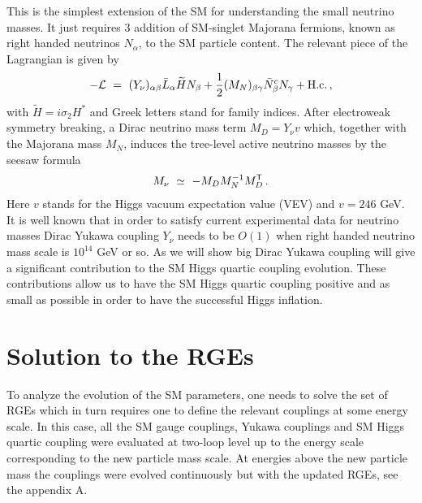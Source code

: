 \documentclass[aps,prd,preprint,superscriptaddress,showpacs,ctexart]{revtex4-1}
\begin{document}
This is the simplest extension of the SM for understanding the small
neutrino masses. It just requires 3 addition of SM-singlet Majorana
fermions, known as right handed neutrinos $N_{\alpha}$, to the SM
particle content. The relevant piece of the Lagrangian is given by
\begin{eqnarray*}
-{\cal L}\ =\ (Y_{\nu})_{\alpha\beta}\bar{L}_{\alpha}\widetilde{H}N_{\beta}+\frac{1}{2}(M_{N})_{\beta\gamma}\bar{N}_{\beta}^{c}N_{\gamma}+{\rm H.c.}\,,
\end{eqnarray*}
with $\widetilde{H}=i\sigma_{2}H^{*}$ and Greek letters stand for
family indices. After electroweak symmetry breaking, a Dirac neutrino
mass term $M_{D}=Y_{\nu}v$ which, together with the Majorana mass
$M_{N}$, induces the tree-level active neutrino masses by the seesaw
formula
\begin{align}
M_{\nu}\ \simeq\ -M_{D}M_{N}^{-1}M_{D}^{\sf T}\,.\label{seesaw}
\end{align}
Here $v$ stands for the Higgs vacuum expectation value (VEV) and
$v=246$ GeV. It is well known that in order to satisfy current experimental
data for neutrino masses Dirac Yukawa coupling $Y_{\nu}$ needs to
be $O(1)$ when right handed neutrino mass scale is $10^{14}$ GeV
or so. As we will show big Dirac Yukawa coupling will give a significant
contribution to the SM Higgs quartic coupling evolution. These
contributions allow us to have the SM Higgs quartic coupling positive and as small as possible
in order to have the successful Higgs inflation.


\section{Solution to the RGEs}

To analyze the evolution of the SM parameters, one needs to solve
the set of RGEs which in turn requires one to define the relevant
couplings at some energy scale. In this case, all the SM gauge couplings,
Yukawa couplings and SM Higgs quartic coupling were evaluated at
two-loop level up to the energy scale corresponding to the new particle
mass scale. At energies above the new particle mass the couplings
were evolved continuously but with the updated RGEs, see the appendix
A.
\end{document}
